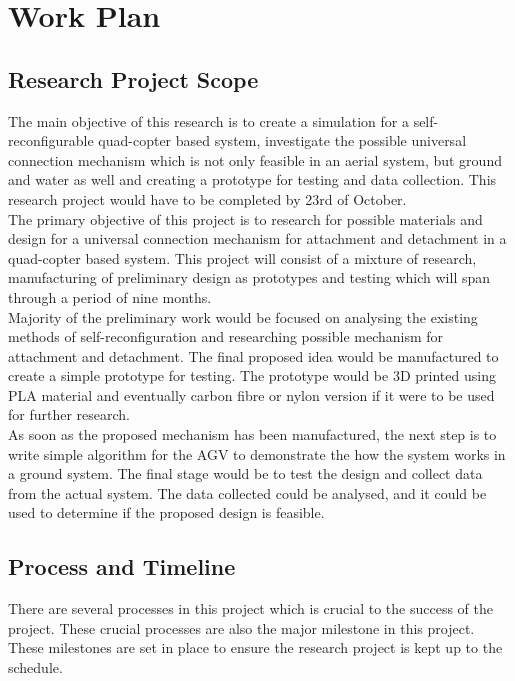 \documentclass[12pt,A4]{article}
\begin{document}
	\section{Work Plan}
	
	\subsection{Research Project Scope}
	
	The main objective of this research is to create a simulation for a self-reconfigurable quad-copter based system, investigate the possible universal connection mechanism which is not only feasible in an aerial system, but ground and water as well and creating a prototype for testing and data collection. This research project would have to be completed by 23rd of October.\\
	
	The primary objective of this project is to research for possible materials and design for a universal connection mechanism for attachment and detachment in a quad-copter based system. This project will consist of a mixture of research, manufacturing of preliminary design as prototypes and testing which will span through a period of nine months.\\
	
	Majority of the preliminary work would be focused on analysing the existing methods of self-reconfiguration and researching possible mechanism for attachment and detachment. The final proposed idea would be manufactured to create a simple prototype for testing. The prototype would be 3D printed using PLA material and eventually carbon fibre or nylon version if it were to be used for further research.\\
	
	As soon as the proposed mechanism has been manufactured, the next step is to write simple algorithm for the AGV to demonstrate the how the system works in a ground system. The final stage would be to test the design and collect data from the actual system. The data collected could be analysed, and it could be used to determine if the proposed design is feasible.\\
	
	\subsection{Process and Timeline}
	
	There are several processes in this project which is crucial to the success of the project. These crucial processes are also the major milestone in this project. These milestones are set in place to ensure the research project is kept up to the schedule.\\
	
\end{document}
